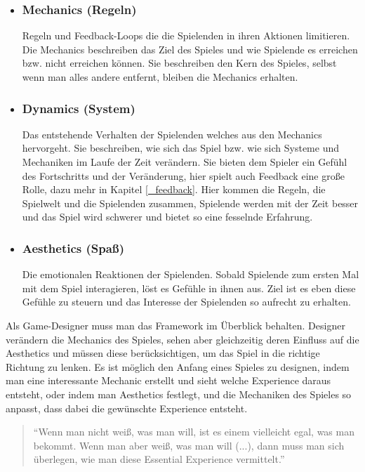 \begin{itemize}
\item\subsubsection{Mechanics (Regeln)}

Regeln und Feedback-Loops die die Spielenden in ihren Aktionen limitieren. Die Mechanics beschreiben das Ziel des Spieles und wie Spielende es erreichen bzw. nicht erreichen können\cite[S.96]{_art_of_gamedesign}. Sie beschreiben den Kern des Spieles, selbst wenn man alles andere entfernt, bleiben die Mechanics erhalten\cite[S.231]{_art_of_gamedesign}.
 
\item\subsubsection{Dynamics (System)}

Das entstehende Verhalten der Spielenden welches aus den Mechanics hervorgeht\cite{_mda}. Sie beschreiben, wie sich das Spiel bzw. wie sich Systeme und Mechaniken im Laufe der Zeit verändern. Sie bieten dem Spieler ein Gefühl des Fortschritts und der Veränderung, hier spielt auch Feedback eine große Rolle, dazu mehr in Kapitel \ref{_feedback}. Hier kommen die Regeln, die Spielwelt und die Spielenden zusammen, Spielende werden mit der Zeit besser und das Spiel wird schwerer und bietet so eine fesselnde Erfahrung.

\item\subsubsection{Aesthetics (Spaß)}

Die emotionalen Reaktionen der Spielenden. Sobald Spielende zum ersten Mal mit dem Spiel interagieren, löst es Gefühle in ihnen aus. Ziel ist es eben diese Gefühle zu steuern und das Interesse der Spielenden so aufrecht zu erhalten.\newline
\end{itemize}

\noindent Als Game-Designer muss man das Framework im Überblick behalten. Designer verändern die Mechanics des Spieles, sehen aber gleichzeitig deren Einfluss auf die Aesthetics und müssen diese berücksichtigen, um das Spiel in die richtige Richtung zu lenken. Es ist möglich den Anfang eines Spieles zu designen, indem man eine interessante Mechanic erstellt und sieht welche Experience daraus entsteht, oder indem man Aesthetics festlegt, und die Mechaniken des Spieles so anpasst, dass dabei die gewünschte Experience entsteht. \begin{quote}"`Wenn man nicht weiß, was man will, ist es einem vielleicht egal, was man bekommt. Wenn man aber weiß, was man will (...), dann muss man sich überlegen, wie man diese Essential Experience vermittelt."'\cite[S.55]{_art_of_gamedesign}\end{quote}

